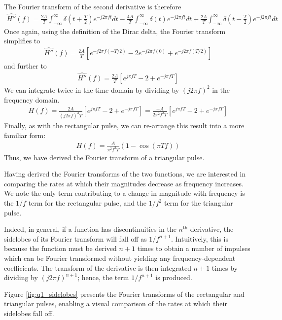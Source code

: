\documentclass[a4paper, 11pt]{article}
\begin{document}
The Fourier transform of the second derivative is therefore
\begin{align*}
    \widehat{H''}(f) = \frac{2A}{T}\int_{-\infty}^\infty \delta(t+\frac{T}{2}) e^{-j2\pi ft} dt -
             \frac{4A}{T}\int_{-\infty}^\infty \delta(t) e^{-j2\pi ft} dt +
             \frac{2A}{T}\int_{-\infty}^\infty \delta(t-\frac{T}{2}) e^{-j2\pi ft} dt
\end{align*}
Once again, using the definition of the Dirac delta, the Fourier transform
simplifies to
\begin{align*}
    \widehat{H''}(f) = \frac{2A}{T} \left[ e^{-j2\pi f(-T/2)} - 2e^{-j2\pi f(0)} + e^{-j2\pi f(T/2)} \right]
\end{align*}
and further to
\begin{align*}
    \widehat{H''}(f) = \frac{2A}{T} \left[ e^{j\pi fT} - 2 + e^{-j\pi fT} \right]
\end{align*}
We can integrate twice in the time domain by dividing by $(j2\pi f)^2$ in the frequency
domain.
\begin{align*}
    H(f) = \frac{2A}{(j2\pi f)^2 T} \left[ e^{j\pi fT} - 2 + e^{-j\pi fT} \right]
         = \frac{-A}{2\pi^2f^2 T} \left[ e^{j\pi fT} - 2 + e^{-j\pi fT} \right]
\end{align*}
Finally, as with the rectangular pulse, we can re-arrange this result into a
more familiar form:
\begin{align*}
    H(f) = \frac{A}{\pi^2f^2T}(1 - \cos(\pi Tf))
\end{align*}
Thus, we have derived the Fourier transform of a triangular pulse.

Having derived the Fourier transforms of the two functions, we are interested in
comparing the rates at which their magnitudes decrease as frequency increases.
We note the only term contributing to a change in magnitude with frequency is
the $1/f$ term for the rectangular pulse, and the $1/f^2$ term for the
triangular pulse.

Indeed, in general, if a function has discontinuities in the $n^\text{th}$
derivative, the sidelobes of its Fourier transform will fall off as $1/f^{n+1}$.
Intuitively, this is because the function must be derived $n+1$ times to obtain
a number of impulses which can be Fourier transformed without yielding any
frequency-dependent coefficients. The transform of the derivative is then
integrated $n+1$ times by dividing by $(j2\pi f)^{n+1}$; hence, the term
$1/f^{n+1}$ is produced.

Figure \ref{fig:q1_sidelobes} presents the Fourier transforms of the rectangular
and triangular pulses, enabling a visual comparison of the rates at which their
sidelobes fall off.
\end{document}
